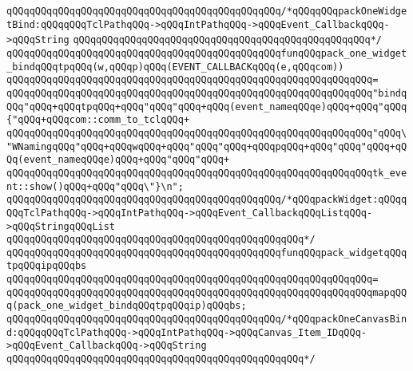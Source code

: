 \verb|qQQqqQQqqQQqqQQqqQQqqQQqqQQqqQQqqQQqqQQqqQQqqQQq/*qQQqqQQqpackOneWidgetBind:qQQqqQQqTclPathqQQq->qQQqIntPathqQQq->qQQqEvent_CallbackqQQq->qQQqString|\newline
\verb|qQQqqQQqqQQqqQQqqQQqqQQqqQQqqQQqqQQqqQQqqQQqqQQqqQQq*/|\newline
\verb|qQQqqQQqqQQqqQQqqQQqqQQqqQQqqQQqqQQqqQQqqQQqqQQqfunqQQqpack_one_widget_bindqQQqtpqQQq(w,qQQqp)qQQq(EVENT_CALLBACKqQQq(e,qQQqcom))|\newline
\verb|qQQqqQQqqQQqqQQqqQQqqQQqqQQqqQQqqQQqqQQqqQQqqQQqqQQqqQQqqQQqqQQq=|\newline
\verb|qQQqqQQqqQQqqQQqqQQqqQQqqQQqqQQqqQQqqQQqqQQqqQQqqQQqqQQqqQQqqQQq"bindqQQq"qQQq+qQQqtpqQQq+qQQq"qQQq"qQQq+qQQq(event_nameqQQqe)qQQq+qQQq"qQQq{"qQQq+qQQqcom::comm_to_tclqQQq+|\newline
\verb|qQQqqQQqqQQqqQQqqQQqqQQqqQQqqQQqqQQqqQQqqQQqqQQqqQQqqQQqqQQqqQQq"qQQq\"WNamingqQQq"qQQq+qQQqwqQQq+qQQq"qQQq"qQQq+qQQqpqQQq+qQQq"qQQq"qQQq+qQQq(event_nameqQQqe)qQQq+qQQq"qQQq"qQQq+|\newline
\verb|qQQqqQQqqQQqqQQqqQQqqQQqqQQqqQQqqQQqqQQqqQQqqQQqqQQqqQQqqQQqqQQqtk_event::show()qQQq+qQQq"qQQq\"}\n";|\newline
\newline
\newline
\newline
\verb|qQQqqQQqqQQqqQQqqQQqqQQqqQQqqQQqqQQqqQQqqQQqqQQq/*qQQqpackWidget:qQQqqQQqTclPathqQQq->qQQqIntPathqQQq->qQQqEvent_CallbackqQQqListqQQq->qQQqStringqQQqList|\newline
\verb|qQQqqQQqqQQqqQQqqQQqqQQqqQQqqQQqqQQqqQQqqQQqqQQqqQQq*/|\newline
\verb|qQQqqQQqqQQqqQQqqQQqqQQqqQQqqQQqqQQqqQQqqQQqqQQqfunqQQqpack_widgetqQQqtpqQQqipqQQqbs|\newline
\verb|qQQqqQQqqQQqqQQqqQQqqQQqqQQqqQQqqQQqqQQqqQQqqQQqqQQqqQQqqQQqqQQq=|\newline
\verb|qQQqqQQqqQQqqQQqqQQqqQQqqQQqqQQqqQQqqQQqqQQqqQQqqQQqqQQqqQQqqQQqmapqQQq(pack_one_widget_bindqQQqtpqQQqip)qQQqbs;|\newline
\newline
\newline
\newline
\verb|qQQqqQQqqQQqqQQqqQQqqQQqqQQqqQQqqQQqqQQqqQQqqQQq/*qQQqpackOneCanvasBind:qQQqqQQqTclPathqQQq->qQQqIntPathqQQq->qQQqCanvas_Item_IDqQQq->qQQqEvent_CallbackqQQq->qQQqString|\newline
\verb|qQQqqQQqqQQqqQQqqQQqqQQqqQQqqQQqqQQqqQQqqQQqqQQqqQQq*/|\newline
